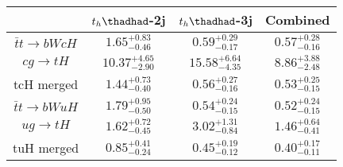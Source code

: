 \centering
\begin{tabular}{cccc} \toprule\toprule
 & $t_h\thadhad$-2j & $t_h\thadhad$-3j & Combined\\\midrule
$\bar{t}t\to bWcH$ & $1.65^{+0.83}_{-0.46}$ & $0.59^{+0.29}_{-0.17}$ & $0.57^{+0.28}_{-0.16}$\\
$cg\to tH$ & $10.37^{+4.65}_{-2.90}$ & $15.58^{+6.64}_{-4.35}$ & $8.86^{+3.88}_{-2.48}$\\
tcH merged & $1.44^{+0.73}_{-0.40}$ & $0.56^{+0.27}_{-0.16}$ & $0.53^{+0.25}_{-0.15}$\\
$\bar{t}t\to bWuH$ & $1.79^{+0.95}_{-0.50}$ & $0.54^{+0.24}_{-0.15}$ & $0.52^{+0.24}_{-0.15}$\\
$ug\to tH$ & $1.62^{+0.72}_{-0.45}$ & $3.02^{+1.31}_{-0.84}$ & $1.46^{+0.64}_{-0.41}$\\
tuH merged & $0.85^{+0.41}_{-0.24}$ & $0.45^{+0.19}_{-0.12}$ & $0.40^{+0.17}_{-0.11}$\\
\bottomrule\bottomrule
\end{tabular}
